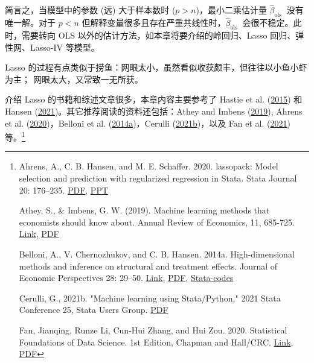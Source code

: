 简言之，当模型中的参数 (远) 大于样本数时 ($p>n$)，最小二乘估计量 $\widehat{\beta}_{\text {ols }}$ 没有唯一解。对于 $p<n$ 但解释变量很多且存在严重共线性时，$\widehat{\beta}_{\text {ols }}$ 会很不稳定。此时，需要转向 OLS 以外的估计方法，如本章将要介绍的岭回归、Lasso 回归、弹性网、Lasso-IV 等模型。 

Lasso 的过程有点类似于捞鱼：网眼太小，虽然看似收获颇丰，但往往以小鱼小虾为主；%
网眼太大，又常致一无所获。%


\vspace{4pt}

介绍 Lasso 的书籍和综述文章很多，本章内容主要参考了 Hastie et al. (\href{https://web.stanford.edu/~hastie/StatLearnSparsity_files/SLS.pdf}{2015}) 和 Hansen (\href{https://www.ssc.wisc.edu/~bhansen/econometrics/Econometrics.pdf}{2021})。其它推荐阅读的资料还包括：Athey and Imbens (\href{http://sci-hub.ren/10.1146/annurev-economics-080217-053433}{2019}), Ahrens et al. (\href{http://sci-hub.ren/10.1177/1536867X20909697}{2020})，Belloni et al. (\href{https://doi.org/10.1257/jep.28.2.29}{2014a})，Cerulli (\href{https://arxiv.org/pdf/2103.03122.pdf}{2021b})，以及 Fan et al. (\href{http://sci-hub.ren/10.1201/9780429096280}{2021}) 等。\footnote{%
Ahrens, A., C. B. Hansen, and M. E. Schaffer. 2020. lassopack: Model selection and prediction with regularized regression in Stata. Stata Journal 20: 176–235. \href{http://sci-hub.ren/10.1177/1536867X20909697}{PDF}, \href{https://statalasso.github.io/pdf/StataConference2018_AhrensSchaffer.pdf}{PPT}

Athey, S., \& Imbens, G. W. (2019). Machine learning methods that economists should know about. Annual Review of Economics, 11, 685-725. \href{https://doi.org/10.1146/annurev-economics-080217-053433}{Link}, \href{http://sci-hub.ren/10.1146/annurev-economics-080217-053433}{PDF}

Belloni, A., V. Chernozhukov, and C. B. Hansen. 2014a. High-dimensional methods and inference on structural and
treatment effects. Journal of Economic Perspectives 28: 29–50. \href{https://doi.org/10.1257/jep.28.2.29}{Link}, \href{http://sci-hub.ren/10.1257/jep.28.2.29}{PDF}, \href{https://academic.oup.com/restud/article/81/2/608/1523757}{Stata-codes}

Cerulli, G., 2021b. "Machine learning using Stata/Python," 2021 Stata Conference 25, Stata Users Group. \href{https://arxiv.org/pdf/2103.03122.pdf}{PDF}

Fan, Jianqing, Runze Li, Cun-Hui Zhang, and Hui Zou. 2020. Statistical Foundations of Data Science. 1st Edition, Chapman and Hall/CRC. \href{https://doi.org/10.1201/9780429096280}{Link}, \href{http://sci-hub.ren/10.1201/9780429096280}{PDF}

}
